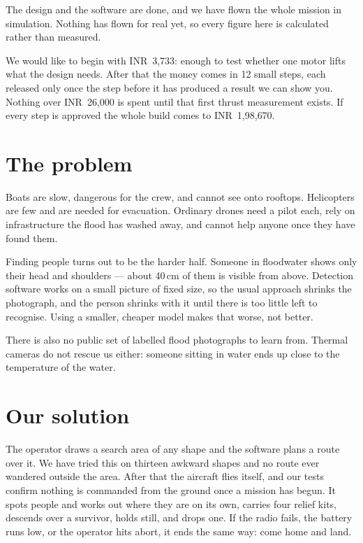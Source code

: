 \documentclass[11pt,a4paper]{article}
\newcommand{\rs}[1]{\mbox{INR~#1}}
\begin{document}
The design and the software are done, and we have flown the whole mission in
simulation. Nothing has flown for real yet, so every figure here is calculated
rather than measured.

We would like to begin with \rs{3{,}733}: enough to test whether one motor
lifts what the design needs. After that the money comes in 12 small steps, each
released only once the step before it has produced a result we can show you.
Nothing over \rs{26{,}000} is spent until that first thrust measurement exists.
If every step is approved the whole build comes to \rs{1{,}98{,}670}.

\section{The problem}

Boats are slow, dangerous for the crew, and cannot see onto rooftops.
Helicopters are few and are needed for evacuation. Ordinary drones need a pilot
each, rely on infrastructure the flood has washed away, and cannot help anyone
once they have found them.

Finding people turns out to be the harder half. Someone in floodwater shows
only their head and shoulders --- about 40\,cm of them is visible from above.
Detection software works on a small picture of fixed size, so the usual
approach shrinks the photograph, and the person shrinks with it until there is
too little left to recognise. Using a smaller, cheaper model makes that worse,
not better.

There is also no public set of labelled flood photographs to learn from. Thermal
cameras do not rescue us either: someone sitting in water ends up close to the
temperature of the water.

\section{Our solution}

The operator draws a search area of any shape and the software plans a route
over it. We have tried this on thirteen awkward shapes and no route ever
wandered outside the area. After that the aircraft flies itself, and our tests
confirm nothing is commanded from the ground once a mission has begun. It spots
people and works out where they are on its own, carries four relief kits,
descends over a survivor, holds still, and drops one. If the radio fails, the
battery runs low, or the operator hits abort, it ends the same way: come home
and land.
\end{document}

